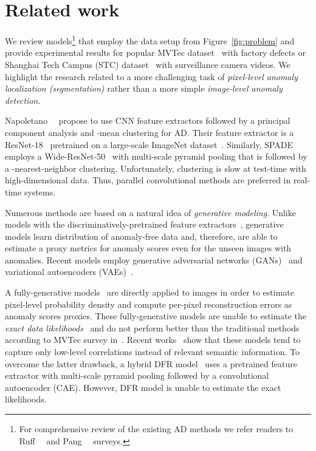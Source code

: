 \documentclass[10pt,twocolumn,letterpaper]{article}
\begin{document}
\section{Related work}
\label{sec:related}
We review models\footnote{For comprehensive review of the existing AD methods we refer readers to Ruff~\etal~\cite{50044} and Pang~\etal~\cite{pang21} surveys.} that employ the data setup from Figure~\ref{fig:problem} and provide experimental results for popular MVTec dataset~\cite{Bergmann_2019_CVPR} with factory defects or Shanghai Tech Campus (STC) dataset~\cite{Luo_2017_ICCV} with surveillance camera videos. We highlight the research related to a more challenging task of \textit{pixel-level anomaly localization (segmentation)} rather than a more simple \textit{image-level anomaly detection}.

Napoletano~\etal~\cite{cnn_feature_dictionary_nanofibres} propose to use CNN feature extractors followed by a principal component analysis and -mean clustering for AD. Their feature extractor is a ResNet-18~\cite{he} pretrained on a large-scale ImageNet dataset~\cite{alexnet}. Similarly, SPADE~\cite{cohen2021subimage} employs a Wide-ResNet-50~\cite{BMVC2016_87} with multi-scale pyramid pooling that is followed by a -nearest-neighbor clustering. Unfortunately, clustering is slow at test-time with high-dimensional data. Thus, parallel convolutional methods are preferred in real-time systems.

Numerous methods are based on a natural idea of \textit{generative modeling}. Unlike models with the discriminatively-pretrained feature extractors~\cite{cnn_feature_dictionary_nanofibres, cohen2021subimage}, generative models learn distribution of anomaly-free data and, therefore, are able to estimate a proxy metrics for anomaly scores even for the unseen images with anomalies. Recent models employ generative adversarial networks (GANs)~\cite{schlegl2019_fast_anogan, schlegl_anogan} and variational autoencoders (VAEs)~\cite{c_baur_vae_gan, q_space_golkov}.

A fully-generative models~\cite{schlegl2019_fast_anogan, schlegl_anogan, c_baur_vae_gan, q_space_golkov} are directly applied to images in order to estimate pixel-level probability density and compute per-pixel reconstruction errors as anomaly scores proxies. These fully-generative models are unable to estimate the \textit{exact data likelihoods}~\cite{bergmann2018ssim, nalisnick2018do} and do not perform better than the traditional methods~\cite{cnn_feature_dictionary_nanofibres, cohen2021subimage} according to MVTec survey in~\cite{Bergmann_2019_CVPR}. Recent works~\cite{schirrmeister2020understanding, kirichenko2020normalizing} show that these models tend to capture only low-level correlations instead of relevant semantic information. To overcome the latter drawback, a hybrid DFR model~\cite{DFR2020} uses a pretrained feature extractor with multi-scale pyramid pooling followed by a convolutional autoencoder (CAE). However, DFR model is unable to estimate the exact likelihoods.
\end{document}
